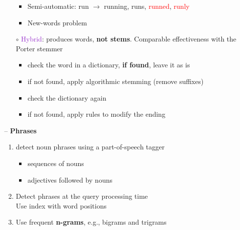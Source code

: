 \begin{itemize}
\begin{itemize}
\begin{itemize}
            \item Semi-automatic: run $\rightarrow$ running, runs, \textcolor{Red}{runned}, \textcolor{Red}{runly}
            \item New-words problem
        \end{itemize}
        \item[$\circ$] \textcolor{DarkOrchid}{Hybrid}: produces words, \textbf{not stems}. Comparable effectiveness with the Porter stemmer
        \begin{itemize}
            \item check the word in a dictionary, \textbf{if found}, leave it as is
            \item if not found, apply algorithmic stemming (remove suffixes)
            \item check the dictionary again
            \item if not found, apply rules to modify the ending
        \end{itemize}
    \end{itemize}
    \item[--] \textbf{Phrases}
    \begin{enumerate}
        \item detect noun phrases using a part-of-speech tagger
        \begin{itemize}
            \item sequences of nouns
            \item adjectives followed by nouns
        \end{itemize}
        \item Detect phrases at the query processing time \\
        Use index with word positions
        \item Use frequent \textbf{n-grams}, e.g., bigrams and trigrams
    \end{enumerate}
\end{itemize}

